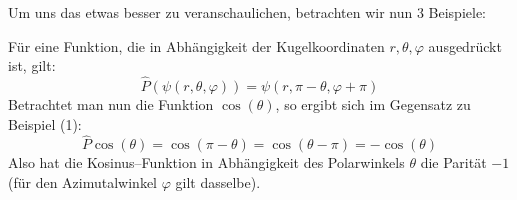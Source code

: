 \documentclass[Ex4_Zusammenfassung.tex]{subfiles}
\begin{document}

Um uns das etwas besser zu veranschaulichen, betrachten wir nun 3 Beispiele:

Für eine Funktion, die in Abhängigkeit der Kugelkoordinaten $r,\theta,\varphi$ ausgedrückt ist, gilt:
\begin{equation}
	\hat{P}(\psi(r,\theta,\varphi)) = \psi(r,\pi-\theta, \varphi+\pi)
\end{equation}
Betrachtet man nun die Funktion $\cos (\theta) $, so ergibt sich im Gegensatz zu Beispiel (1):
\begin{equation*}
	\hat{P} \cos (\theta) = \cos (\pi-\theta) = \cos (\theta-\pi) = -\cos(\theta)
\end{equation*}
Also hat die Kosinus--Funktion in Abhängigkeit des Polarwinkels $\theta$ die Parität $-1$ (für den Azimutalwinkel $\varphi$ gilt dasselbe).
\end{document}

